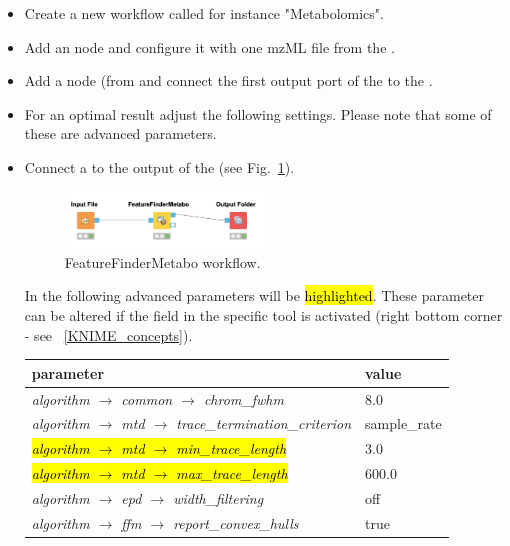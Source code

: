 \begin{itemize}
\item
Create a new workflow called for instance "Metabolomics".
\item
Add an  node and configure it with one mzML file from the .
\item
Add a  node (from  and connect the first output port of the  to the .
\item
For an optimal result adjust the following settings.
Please note that some of these are advanced parameters.
\item
Connect a  to the output of the  (see Fig.~\ref{fig:minimal_FFM_wf}).

\begin{figure}[!htbp]
  \centering
  \includegraphics[width=0.5\textwidth]{graphics/metabo/minimal_FFM_wf.png}
  \caption{FeatureFinderMetabo workflow.}
  \label{fig:minimal_FFM_wf}
\end{figure}

In the following advanced parameters will be \hl{highlighted}. These parameter can be altered if the  field in the specific tool is activated (right bottom corner - see ~\ref{KNIME_concepts}). 

\begin{center}
\begin{tabular}{l|l}
\textbf{parameter} & \textbf{value} \\ \hline
\textit{algorithm $\rightarrow$ common $\rightarrow$ chrom\_fwhm} & $8.0$ \\
\textit{algorithm $\rightarrow$ mtd $\rightarrow$ trace\_termination\_criterion} & sample\_rate \\
\hl{\textit{algorithm $\rightarrow$ mtd $\rightarrow$ min\_trace\_length}} & $3.0$ \\
\hl{\textit{algorithm $\rightarrow$ mtd $\rightarrow$ max\_trace\_length}} & $600.0$\\
\textit{algorithm $\rightarrow$ epd $\rightarrow$ width\_filtering} & off \\
\textit{algorithm $\rightarrow$ ffm $\rightarrow$ report\_convex\_hulls} & true
\end{tabular}
\end{center}
\end{itemize}

